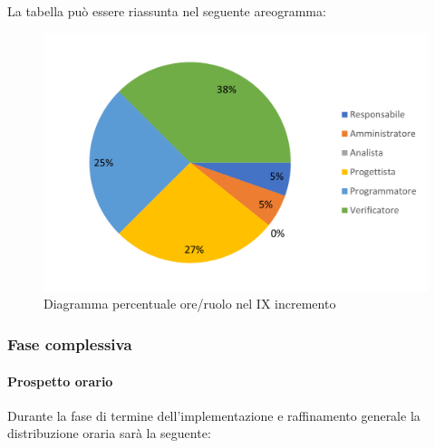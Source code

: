 La tabella può essere riassunta nel seguente areogramma:
\begin{figure}[H]
	\centering
	\includegraphics[width=0.8\linewidth]{res/images/preventivo/dettaglio_termineimp/2-2.png}
	\caption{Diagramma percentuale ore/ruolo nel IX incremento}
	\label{fig:diagramma costi ruolo IX incremento}
\end{figure}
\subsubsection{Fase complessiva}

\paragraph{Prospetto orario}
Durante la fase di termine dell'implementazione e raffinamento generale la distribuzione oraria sarà la seguente:

